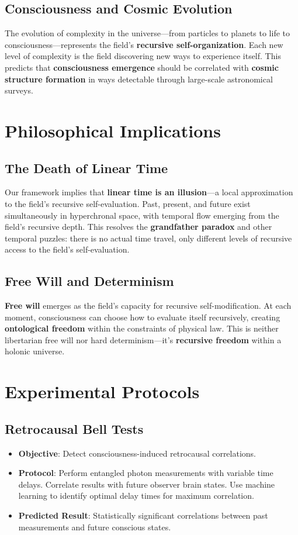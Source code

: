 \documentclass[aps,prd,twocolumn,superscriptaddress,nofootinbib]{revtex4-2}
\begin{document}
\subsection{Consciousness and Cosmic Evolution}
The evolution of complexity in the universe—from particles to planets to life to consciousness—represents the field's \textbf{recursive self-organization}. Each new level of complexity is the field discovering new ways to experience itself. This predicts that \textbf{consciousness emergence} should be correlated with \textbf{cosmic structure formation} in ways detectable through large-scale astronomical surveys.

\section{Philosophical Implications}

\subsection{The Death of Linear Time}
Our framework implies that \textbf{linear time is an illusion}—a local approximation to the field's recursive self-evaluation. Past, present, and future exist simultaneously in hyperchronal space, with temporal flow emerging from the field's recursive depth. This resolves the \textbf{grandfather paradox} and other temporal puzzles: there is no actual time travel, only different levels of recursive access to the field's self-evaluation.

\subsection{Free Will and Determinism}
\textbf{Free will} emerges as the field's capacity for recursive self-modification. At each moment, consciousness can choose how to evaluate itself recursively, creating \textbf{ontological freedom} within the constraints of physical law. This is neither libertarian free will nor hard determinism—it's \textbf{recursive freedom} within a holonic universe.

\section{Experimental Protocols}

\subsection{Retrocausal Bell Tests}
\begin{itemize}
    \item \textbf{Objective}: Detect consciousness-induced retrocausal correlations.
    \item \textbf{Protocol}: Perform entangled photon measurements with variable time delays. Correlate results with future observer brain states. Use machine learning to identify optimal delay times for maximum correlation.
    \item \textbf{Predicted Result}: Statistically significant correlations between past measurements and future conscious states.
\end{itemize}
\end{document}
